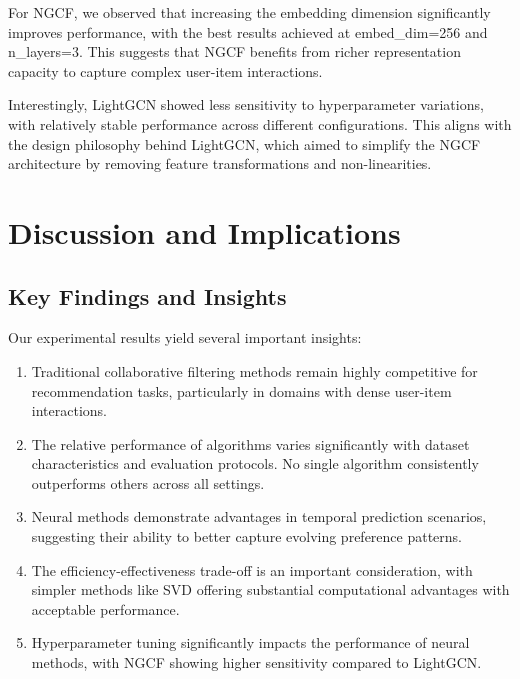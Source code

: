 \documentclass[sigconf,nonacm]{acmart} %
\begin{document}
For NGCF, we observed that increasing the embedding dimension significantly improves performance, with the best results achieved at embed\_dim=256 and n\_layers=3. This suggests that NGCF benefits from richer representation capacity to capture complex user-item interactions.  

Interestingly, LightGCN showed less sensitivity to hyperparameter variations, with relatively stable performance across different configurations. This aligns with the design philosophy behind LightGCN, which aimed to simplify the NGCF architecture by removing feature transformations and non-linearities.  

\section{Discussion and Implications}  

\subsection{Key Findings and Insights}  

Our experimental results yield several important insights:  

\begin{enumerate}  
    \item Traditional collaborative filtering methods remain highly competitive for recommendation tasks, particularly in domains with dense user-item interactions.  
    
    \item The relative performance of algorithms varies significantly with dataset characteristics and evaluation protocols. No single algorithm consistently outperforms others across all settings.  
    
    \item Neural methods demonstrate advantages in temporal prediction scenarios, suggesting their ability to better capture evolving preference patterns.  
    
    \item The efficiency-effectiveness trade-off is an important consideration, with simpler methods like SVD offering substantial computational advantages with acceptable performance.  
    
    \item Hyperparameter tuning significantly impacts the performance of neural methods, with NGCF showing higher sensitivity compared to LightGCN.  
\end{enumerate}  
\end{document}
